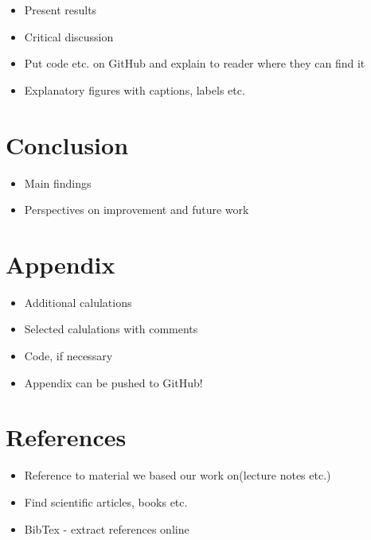 \documentclass[12pt]{article}
\begin{document}
\begin{itemize}
\item Present results
\item Critical discussion
\item Put code etc. on GitHub and explain to reader where they can find it
\item Explanatory figures with captions, labels etc.
\end{itemize}


\section{Conclusion}

\begin{itemize}
\item Main findings
\item Perspectives on improvement and future work
\end{itemize}

\section{Appendix}

\begin{itemize}
\item Additional calulations
\item Selected calulations with comments
\item Code, if necessary
\item Appendix can be pushed to GitHub!
\end{itemize}

\section{References}

\begin{itemize}
\item Reference to material we based our work on(lecture notes etc.)
\item Find scientific articles, books etc.
\item BibTex - extract references online
\end{itemize}
\end{document}
